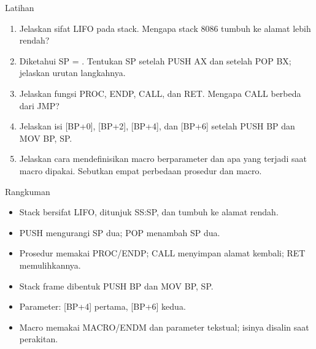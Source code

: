 \documentclass[aspectratio=169,11pt]{beamer}
\begin{document}
\begin{frame}{Latihan}
\small
\begin{enumerate}
    \item Jelaskan sifat LIFO pada stack. Mengapa stack 8086 tumbuh
          ke alamat lebih rendah?

    \vspace{0.15em}
    \item Diketahui SP = . Tentukan SP setelah PUSH AX dan
          setelah POP BX; jelaskan urutan langkahnya.

    \vspace{0.15em}
    \item Jelaskan fungsi PROC, ENDP, CALL, dan RET. Mengapa CALL
          berbeda dari JMP?

    \vspace{0.15em}
    \item Jelaskan isi [BP+0], [BP+2], [BP+4], dan [BP+6] setelah
          PUSH BP dan MOV BP, SP.

    \vspace{0.15em}
    \item Jelaskan cara mendefinisikan macro berparameter dan apa
          yang terjadi saat macro dipakai. Sebutkan empat perbedaan
          prosedur dan macro.
\end{enumerate}
\end{frame}

\begin{frame}{Rangkuman}
\small
\begin{itemize}
    \item Stack bersifat LIFO, ditunjuk SS:SP, dan tumbuh ke alamat
          rendah.

    \vspace{0.15em}
    \item PUSH mengurangi SP dua; POP menambah SP dua.

    \vspace{0.15em}
    \item Prosedur memakai PROC/ENDP; CALL menyimpan alamat kembali;
          RET memulihkannya.

    \vspace{0.15em}
    \item Stack frame dibentuk PUSH BP dan MOV BP, SP.

    \vspace{0.15em}
    \item Parameter: [BP+4] pertama, [BP+6] kedua.

    \vspace{0.15em}
    \item Macro memakai MACRO/ENDM dan parameter tekstual; isinya
          disalin saat perakitan.
\end{itemize}
\end{frame}
\end{document}

